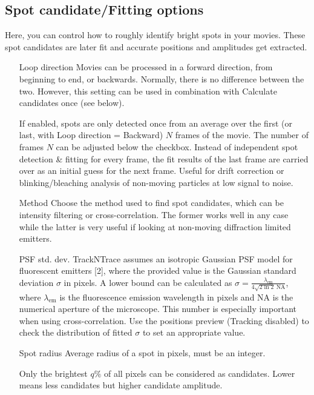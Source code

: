 \documentclass[11pt,onside]{report}
\makeatletter
\numberwithin{equation}{chapter}
\gdef\tshortstack{\@ifnextchar[\@tshortstack{\@tshortstack[c]}}
\gdef\@tshortstack[#1]{%
  \leavevmode
  \vtop\bgroup
    \baselineskip-\p@\lineskip 3\p@
    \let\mb@l\hss\let\mb@r\hss
    \expandafter\let\csname mb@#1\endcsname\relax
    \let\\\@stackcr
    \@ishortstack}
\makeatother
\begin{document}
\subsection*{Spot candidate/Fitting options}
Here, you can control how to roughly identify bright spots in your movies. These spot candidates are later fit and accurate positions and amplitudes get extracted. 
\begin{itemize}[leftmargin=2cm]
\item[Loop direction] Movies can be processed in a forward direction, from beginning to end, or backwards. Normally, there is no difference between the two. However, this setting can be used in combination with \textsf{Calculate candidates once} (see below).
\item[\smash{\tshortstack[1]{Calculate candi-\\dates once}}] If enabled, spots are only detected once from an average over the first (or last, with \textsf{Loop direction = Backward}) $N$ frames of the movie. The number of frames $N$ can be adjusted below the checkbox. Instead of independent spot detection \& fitting for every frame, the fit results of the last frame are carried over as an initial guess for the next frame. Useful for drift correction or blinking/bleaching analysis of non-moving particles at low signal to noise.
\item[Method] Choose the method used to find spot candidates, which can be intensity filtering or cross-correlation. The former works well in any case while the latter is very useful if looking at non-moving diffraction limited emitters.
\item[PSF std. dev.] TrackNTrace assumes an isotropic Gaussian PSF model for fluorescent emitters [2], where the provided value is the Gaussian standard deviation $\sigma$ in pixels. A lower bound can be calculated as $\sigma = \frac{\lambda_\mathrm{em}}{4\sqrt{2\ln 2}\: \mathrm{NA}}$, where $\lambda_\mathrm{em}$ is the fluorescence emission wavelength in pixels and NA is the numerical aperture of the microscope. This number is especially important when using cross-correlation. Use the positions preview (\textsf{Tracking} disabled) to check the distribution of fitted $\sigma$ to set an appropriate value.
\item[Spot radius] Average radius of a spot in pixels, must be an integer.
\item[\smash{\tshortstack[1]{Percent brightest\\ pixels}}] Only the brightest $q\%$ of all pixels can be considered as candidates. Lower means less candidates but higher candidate amplitude.

\end{itemize}
\end{document}

